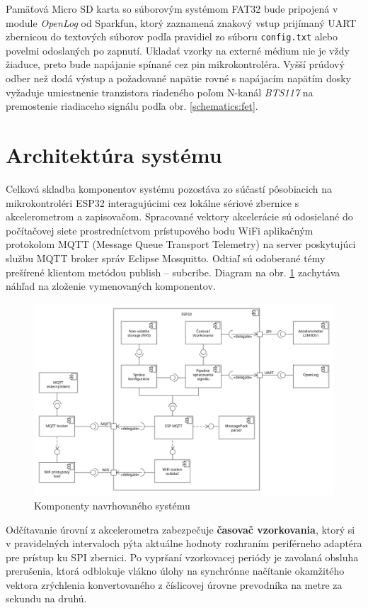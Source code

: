 Pamäťová Micro SD karta so súborovým systémom FAT32 bude pripojená v module \emph{OpenLog} od Sparkfun, ktorý zaznamená znakový
vstup prijímaný UART zbernicou do textových súborov podľa pravidiel zo súboru \verb|config.txt| alebo povelmi odoslaných 
po zapnutí. Ukladať vzorky na externé médium nie je vždy žiaduce, preto bude napájanie spínané cez pin mikrokontroléra. Vyšší 
prúdový odber než dodá výstup a požadované napätie rovné s napájacím napätím dosky vyžaduje umiestnenie tranzistora riadeného 
poľom N-kanál \emph{BTS117} na premostenie riadiaceho signálu podľa obr. \ref{schematics:fet}.


\section{Architektúra systému}
Celková skladba komponentov systému pozostáva zo súčastí pôsobiacich na mikrokontroléri ESP32
interagujúcimi cez lokálne sériové zbernice s akcelerometrom a zapisovačom. Spracované vektory akcelerácie sú 
odosielané do počítačovej siete prostredníctvom prístupového bodu WiFi aplikačným protokolom MQTT (Message Queue Transport Telemetry)
na server poskytujúci službu MQTT broker správ Eclipse Mosquitto. Odtiaľ sú odoberané témy prešírené klientom metódou publish -- subcribe.
Diagram na obr. \ref{uml:component} zachytáva náhľad na zloženie vymenovaných komponentov. 

\begin{figure}[h]
	\centering
	\includegraphics[width=\textwidth]{figures/design/components.png}
	\caption{Komponenty navrhovaného systému}
	\label{uml:component}
\end{figure}

Odčítavanie úrovní z akcelerometra zabezpečuje \textbf{časovač vzorkovania}, ktorý si v pravidelných intervaloch pýta aktuálne 
hodnoty rozhraním periférneho adaptéra pre prístup ku SPI zbernici. Po vypršaní vzorkovacej periódy je zavolaná obsluha prerušenia, ktorá 
odblokuje vlákno úlohy na synchrónne načítanie okamžitého vektora zrýchlenia konvertovaného z číslicovej úrovne prevodníka na metre za 
sekundu na druhú. 

